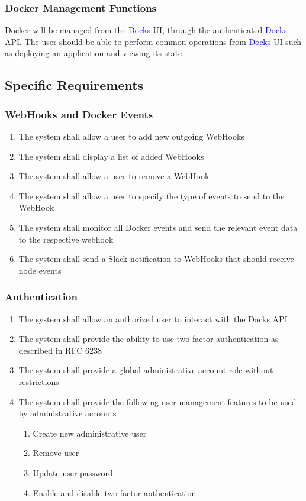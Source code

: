 \documentclass[]{article}
\newcommand{\docks}{\textcolor{Blue}{Docks} }
\newcommand{\docker}{Docker }
\begin{document}
\subsubsection{\docker Management Functions}
\docker will be managed from the \docks UI, through the authenticated
\docks API. The user should be able to perform common operations
from \docks UI such as deploying an application and viewing its state.

\subsection{Specific Requirements}

\subsubsection{WebHooks and Docker Events}
\begin{enumerate}[label=R1.\arabic*.]
	\item The system shall allow a user to add new outgoing WebHooks
	\item The system shall display a list of added WebHooks
	\item The system shall allow a user to remove a WebHook
	\item The system shall allow a user to specify the type of events to send to the WebHook
	\item The system shall monitor all \docker events and send the relevant event data to the respective webhook
	\item The system shall send a Slack notification to WebHooks that should receive node events
\end{enumerate}

\subsubsection{Authentication}
\begin{enumerate}[label*=R2.\arabic*.]
	\item The system shall allow an authorized user to interact with the Docks API
	\item The system shall provide the ability to use two factor authentication as described in RFC 6238
	\item The system shall provide a global administrative account role without restrictions
	\item The system shall provide the following user management features to be used by administrative accounts
	\begin{enumerate}[label*=\arabic*.]
		\item Create new administrative user
		\item Remove user
		\item Update user password
		\item Enable and disable two factor authentication
	\end{enumerate}
\end{enumerate}
\end{document}
